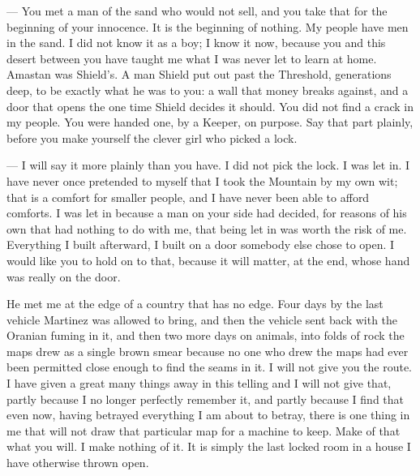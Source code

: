 \begin{room}

--- You met a man of the sand who would not sell, and you take that for the beginning of your innocence. It is the beginning of nothing. My people have men in the sand. I did not know it as a boy; I know it now, because you and this desert between you have taught me what I was never let to learn at home. Amastan was Shield's. A man Shield put out past the Threshold, generations deep, to be exactly what he was to you: a wall that money breaks against, and a door that opens the one time Shield decides it should. You did not find a crack in my people. You were handed one, by a Keeper, on purpose. Say that part plainly, before you make yourself the clever girl who picked a lock.

--- I will say it more plainly than you have. I did not pick the lock. I was let in. I have never once pretended to myself that I took the Mountain by my own wit; that is a comfort for smaller people, and I have never been able to afford comforts. I was let in because a man on your side had decided, for reasons of his own that had nothing to do with me, that being let in was worth the risk of me. Everything I built afterward, I built on a door somebody else chose to open. I would like you to hold on to that, because it will matter, at the end, whose hand was really on the door.

\end{room}

He met me at the edge of a country that has no edge. Four days by the last vehicle Martinez was allowed to bring, and then the vehicle sent back with the Oranian fuming in it, and then two more days on animals, into folds of rock the maps drew as a single brown smear because no one who drew the maps had ever been permitted close enough to find the seams in it. I will not give you the route. I have given a great many things away in this telling and I will not give that, partly because I no longer perfectly remember it, and partly because I find that even now, having betrayed everything I am about to betray, there is one thing in me that will not draw that particular map for a machine to keep. Make of that what you will. I make nothing of it. It is simply the last locked room in a house I have otherwise thrown open.\par


